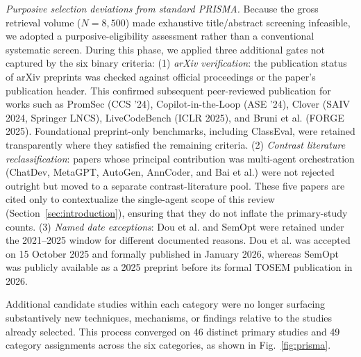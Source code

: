 \documentclass[10pt,a4paper]{article}
\begin{document}
\noindent\textit{Purposive selection deviations from standard PRISMA.} Because the gross retrieval volume ($N=8{,}500$) made exhaustive title/abstract screening infeasible, we adopted a purposive-eligibility assessment rather than a conventional systematic screen. During this phase, we applied three additional gates not captured by the six binary criteria: (1) \textit{arXiv verification}: the publication status of arXiv preprints was checked against official proceedings or the paper's publication header. This confirmed subsequent peer-reviewed publication for works such as PromSec (CCS '24), Copilot-in-the-Loop (ASE '24), Clover (SAIV 2024, Springer LNCS), LiveCodeBench (ICLR 2025), and Bruni et al. (FORGE 2025). Foundational preprint-only benchmarks, including ClassEval, were retained transparently where they satisfied the remaining criteria. (2) \textit{Contrast literature reclassification}: papers whose principal contribution was multi-agent orchestration (ChatDev, MetaGPT, AutoGen, AnnCoder, and Bai et al.) were not rejected outright but moved to a separate contrast-literature pool. These five papers are cited only to contextualize the single-agent scope of this review (Section~\ref{sec:introduction}), ensuring that they do not inflate the primary-study counts. (3) \textit{Named date exceptions}: Dou et al. and SemOpt were retained under the 2021--2025 window for different documented reasons. Dou et al. was accepted on 15 October 2025 and formally published in January 2026, whereas SemOpt was publicly available as a 2025 preprint before its formal TOSEM publication in 2026.

Additional candidate studies within each category were no longer surfacing substantively new techniques, mechanisms, or findings relative to the studies already selected. This process converged on 46 distinct primary studies and 49 category assignments across the six categories, as shown in Fig.~\ref{fig:prisma}.
\end{document}
